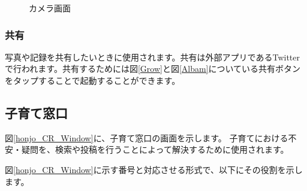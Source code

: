\documentclass[a4j]{jarticle}
\begin{document}
\begin{figure}[H]
    \begin{center}
    \caption {カメラ画面}
    \label{Camera}
    \end{center}
\end{figure}


\subsubsection{共有}
写真や記録を共有したいときに使用されます。共有は外部アプリであるTwitterで行われます。共有するためには図\ref{Grow}と図\ref{Albam}についている共有ボタンをタップすることで起動することができます。

\subsection{子育て窓口}
図\ref{honjo_CR_Window}に、子育て窓口の画面を示します。
子育てにおける不安・疑問を、検索や投稿を行うことによって解決するために使用されます。

図\ref{honjo_CR_Window}に示す番号と対応させる形式で、以下にその役割を示します。
\end{document}
